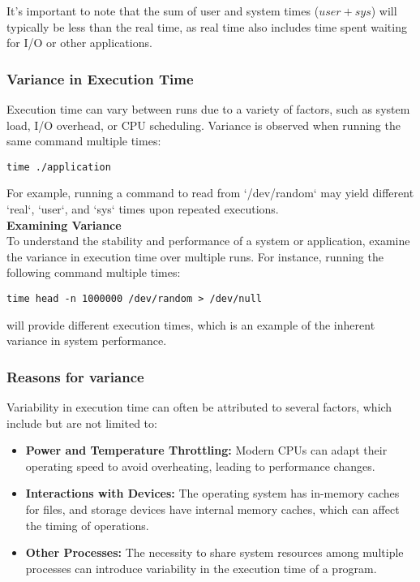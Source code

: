 \documentclass[12pt]{article}
\begin{document}
It's important to note that the sum of user and system times (\(user + sys\)) will typically be less than the real time, as real time also includes time spent waiting for I/O or other applications.

\subsubsection{Variance in Execution Time}
Execution time can vary between runs due to a variety of factors, such as system load, I/O overhead, or CPU scheduling. Variance is observed when running the same command multiple times:

\begin{verbatim}
time ./application
\end{verbatim}

For example, running a command to read from `/dev/random` may yield different `real`, `user`, and `sys` times upon repeated executions.\\

\textbf{Examining Variance}\\
To understand the stability and performance of a system or application, examine the variance in execution time over multiple runs. For instance, running the following command multiple times:

\begin{verbatim}
time head -n 1000000 /dev/random > /dev/null
\end{verbatim}

will provide different execution times, which is an example of the inherent variance in system performance.


\subsubsection{Reasons for variance}
Variability in execution time can often be attributed to several factors, which include but are not limited to:

\begin{itemize}
    \item \textbf{Power and Temperature Throttling:}
    Modern CPUs can adapt their operating speed to avoid overheating, leading to performance changes.
    
    \item \textbf{Interactions with Devices:}
    The operating system has in-memory caches for files, and storage devices have internal memory caches, which can affect the timing of operations.
    
    \item \textbf{Other Processes:}
    The necessity to share system resources among multiple processes can introduce variability in the execution time of a program.
\end{itemize}
\end{document}
